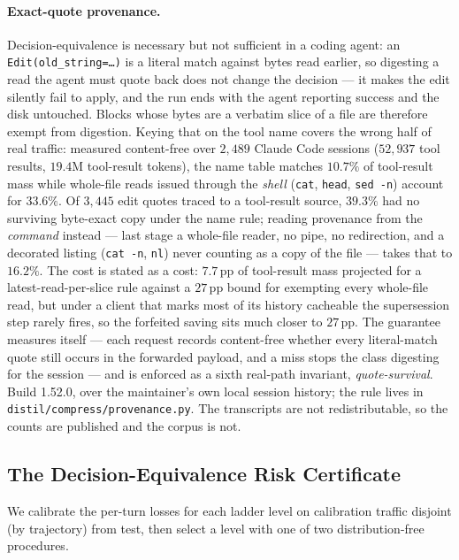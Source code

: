 \documentclass{article}
\begin{document}
\paragraph{Exact-quote provenance.} Decision-equivalence is necessary but not sufficient in a
coding agent: an \texttt{Edit(old\_string=\ldots)} is a literal match against bytes read
earlier, so digesting a read the agent must quote back does not change the decision --- it
makes the edit silently fail to apply, and the run ends with the agent reporting success and
the disk untouched. Blocks whose bytes are a verbatim slice of a file are therefore exempt
from digestion. Keying that on the tool name covers the wrong half of real traffic: measured
content-free over $2{,}489$ Claude Code sessions ($52{,}937$ tool results, $19.4$M
tool-result tokens), the name table matches $10.7\%$ of tool-result mass while whole-file
reads issued through the \emph{shell} (\texttt{cat}, \texttt{head}, \texttt{sed -n}) account
for $33.6\%$. Of $3{,}445$ edit quotes traced to a tool-result source, $39.3\%$ had no
surviving byte-exact copy under the name rule; reading provenance from the \emph{command}
instead --- last stage a whole-file reader, no pipe, no redirection, and a decorated listing
(\texttt{cat -n}, \texttt{nl}) never counting as a copy of the file --- takes that to
$16.2\%$. The cost is stated as a cost: $7.7$\,pp of tool-result mass projected for a
latest-read-per-slice rule against a $27$\,pp bound for exempting every whole-file read, but
under a client that marks most of its history cacheable the supersession step rarely fires,
so the forfeited saving sits much closer to $27$\,pp. The guarantee measures itself --- each
request records content-free whether every literal-match quote still occurs in the forwarded
payload, and a miss stops the class digesting for the session --- and is enforced as a sixth
real-path invariant, \emph{quote-survival}. Build 1.52.0, over the maintainer's own local session history; the rule lives in
\texttt{distil/compress/provenance.py}. The transcripts are not redistributable, so the
counts are published and the corpus is not.

\subsection{The Decision-Equivalence Risk Certificate}
We calibrate the per-turn losses for each ladder level on calibration traffic
disjoint (by trajectory) from test, then select a level with one of two
distribution-free procedures.
\end{document}
